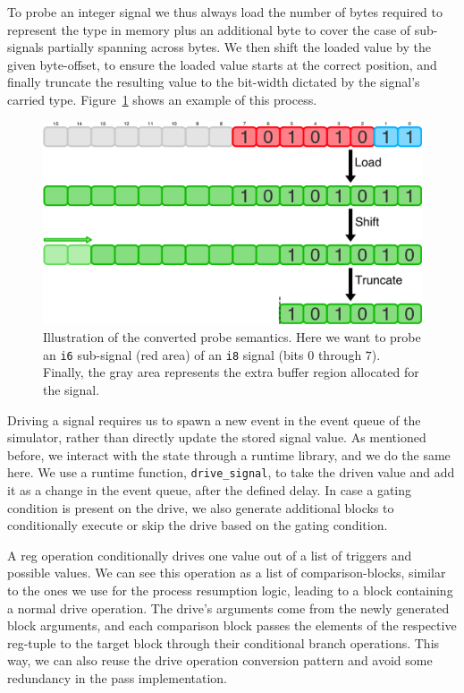 To probe an integer signal we thus always load the number of bytes required to represent the type in memory plus an additional byte to cover the case of sub-signals partially spanning across bytes. We then shift the loaded value by the given byte-offset, to ensure the loaded value starts at the correct position, and finally truncate the resulting value to the bit-width dictated by the signal's carried type. Figure~\ref{fig:prb} shows an example of this process.

\begin{figure}[ht]
    \includegraphics[width=\textwidth]{gfx/Probe.png}
    \caption[Illustration of the converted probe semantics.]{Illustration of the converted probe semantics. Here we want to probe an \texttt{i6} sub-signal (red area) of an \texttt{i8} signal (bits $0$
        through $7$). Finally, the gray area represents the extra buffer region allocated for the signal.}
    \label{fig:prb}
\end{figure}

Driving a signal requires us to spawn a new event in the event queue of the simulator, rather than directly update the stored signal value. As mentioned before, we interact with the state through a runtime library, and we do the same here. We use a runtime function, \texttt{drive\_signal}, to take the driven value and add it as a change in the event queue, after the defined delay.
In case a gating condition is present on the drive, we also generate additional blocks to conditionally execute or skip the drive based on the gating condition.

A reg operation conditionally drives one value out of a list of triggers and possible values. We can see this operation as a list of comparison-blocks, similar to the ones we use for the process resumption logic, leading to a block containing a normal drive operation. The drive's arguments come from the newly generated block arguments, and each comparison block passes the elements of the respective reg-tuple to the target block through their conditional branch operations. This way, we can also reuse the drive operation conversion pattern and avoid some redundancy in the pass implementation.

